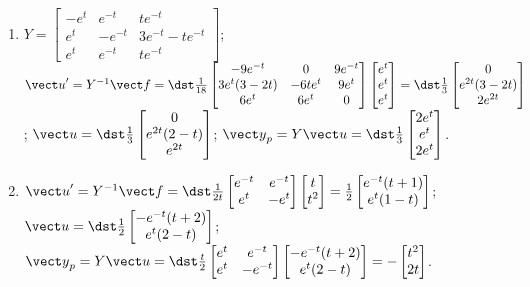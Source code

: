 \documentclass[openany]{book}
\newenvironment{sectionSolutions}{
 \begin{enumerate}[item-label={\thesection.\arabic{enumi}.}]
}{
 \end{enumerate}
}
\begin{document}
\begin{sectionSolutions}
\item
$Y=\begin{bmatrix}
-e^t&e^{-t}&te^{-t}\\e^t&-e^{-t}&3e^{-t}-te^{-t}\\
e^t&e^{-t}&te^{-t}\end{bmatrix}$;
${\vect u}'=Y^{-1}{\vect f}=
\dst\frac{1}{18}\begin{bmatrix}
-9e^{-t}&0&9e^{-t}\\3e^t(3-2t)&-6te^t&9e^t\\
6e^t&6e^t&0\end{bmatrix}
\begin{bmatrix}e^t\\e^t\\e^t\end{bmatrix}=
\dst\frac{1}{3}\begin{bmatrix}0\\
e^{2t}(3-2t)\\2e^{2t}\end{bmatrix}$;
${\vect u}=
\dst\frac{1}{3}\begin{bmatrix}0\\
e^{2t}(2-t)\\e^{2t}\end{bmatrix}$;
${\vect y}_p=Y{\vect u}=
\dst\frac{1}{3}\begin{bmatrix}
2e^t\\e^t\\2e^t\end{bmatrix}$.


\item
${\vect u}'=Y^{-1}{\vect f}=
\dst\frac{1}{2t}\begin{bmatrix}
e^{-t}&e^{-t}\\e^t&-e^t\end{bmatrix}
\begin{bmatrix}t\\t^2\end{bmatrix}=
\frac{1}{2}\begin{bmatrix}
e^{-t}(t+1)\\e^t(1-t)\end{bmatrix}$;
${\vect u}=
\dst\frac{1}{2}\begin{bmatrix}
-e^{-t}(t+2)\\e^t(2-t)\end{bmatrix}$;
${\vect y}_p=Y{\vect u}=
\dst\frac{t}{2}\begin{bmatrix}
e^t&e^{-t}\\e^t&-e^{-t}\end{bmatrix}
\begin{bmatrix}-e^{-t}(t+2)\\
e^t(2-t)\end{bmatrix}=
-\begin{bmatrix}t^2\\2t\end{bmatrix}$.




\end{sectionSolutions}
\end{document}

